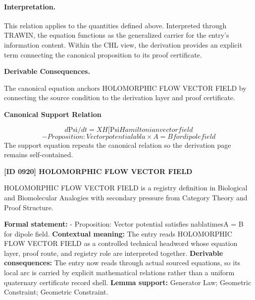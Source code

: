 \paragraph{Interpretation.}
This relation applies to the quantities defined above. Interpreted through TRAWIN, the equation functions as the generalized carrier for the entry’s information content. Within the CHL view, the derivation provides an explicit term connecting the canonical proposition to its proof certificate.

\par\vspace{0.35em}
\noindent\textbf{Derivable Consequences.}\quad
\begingroup
\footnotesize
\raggedright
The canonical equation anchors HOLOMORPHIC FLOW VECTOR FIELD by connecting the source condition to the derivation layer and proof certificate.
\par\endgroup

\noindent\textbf{Canonical Support Relation}\par
\[
d\mathrm{Psi}/dt = XH[\mathrm{Psi} Hamiltonian vector field
\]
\[
- Proposition: Vector potential  abla\times A = B for dipole field
\]
\noindent The support equation repeats the canonical relation so the derivation page remains self-contained.\par

\clearpage
\noindent\textbf{[ID 0920] HOLOMORPHIC FLOW VECTOR FIELD}\par
\vspace{0.35em}
\begingroup\small
{}
HOLOMORPHIC FLOW VECTOR FIELD is a registry definition in Biological and Biomolecular Analogies with secondary pressure from Category Theory and Proof Structure.

\begingroup\footnotesize\setlength{\emergencystretch}{3em}\sloppy
\textbf{Formal statement:} - Proposition: Vector potential satisfies nablatimesA = B for dipole field. \textbf{Contextual meaning:} The entry reads HOLOMORPHIC FLOW VECTOR FIELD as a controlled technical headword whose equation layer, proof route, and registry role are interpreted together. \textbf{Derivable consequences:} The entry now reads through actual sourced equations, so its local arc is carried by explicit mathematical relations rather than a uniform quaternary certificate record shell. \textbf{Lemma support:} Generator Law; Geometric Constraint; Geometric Constraint.\par
\endgroup

